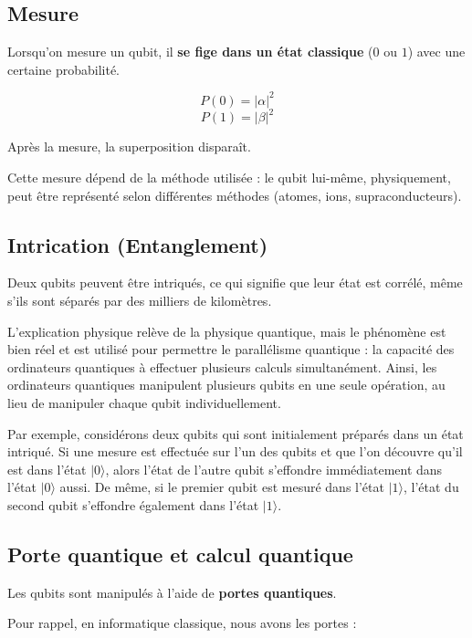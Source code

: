 \documentclass{article}
\begin{document}
\subsection{Mesure}

Lorsqu’on mesure un qubit, il \textbf{se fige dans un état classique} ($0$ ou $1$) avec une certaine probabilité.

\[ P(0) = |\alpha|^2 \]
\[ P(1) = |\beta|^2 \]

Après la mesure, la superposition disparaît.

Cette mesure dépend de la méthode utilisée : le qubit lui-même, physiquement, peut être représenté selon différentes méthodes (atomes, ions, supraconducteurs).\cite{microsoftQubit2025}\cite{stackexchangeQubitState2019}

\subsection{Intrication (Entanglement)}

Deux qubits peuvent être intriqués, ce qui signifie que leur état est corrélé, même s’ils sont séparés par des milliers de kilomètres.

L’explication physique relève de la physique quantique, mais le phénomène est bien réel et est utilisé pour permettre le parallélisme quantique : la capacité des ordinateurs quantiques à effectuer plusieurs calculs simultanément. Ainsi, les ordinateurs quantiques manipulent plusieurs qubits en une seule opération, au lieu de manipuler chaque qubit individuellement.

Par exemple, considérons deux qubits qui sont initialement préparés dans un état intriqué. Si une mesure est effectuée sur l’un des qubits et que l’on découvre qu’il est dans l’état $|0\rangle$, alors l’état de l’autre qubit s’effondre immédiatement dans l’état $|0\rangle$ aussi. De même, si le premier qubit est mesuré dans l’état $|1\rangle$, l’état du second qubit s’effondre également dans l’état $|1\rangle$.\cite{microsoftEntanglement2025}

\subsection{Porte quantique et calcul quantique}

Les qubits sont manipulés à l’aide de \textbf{portes quantiques}.

Pour rappel, en informatique classique, nous avons les portes :
\end{document}
